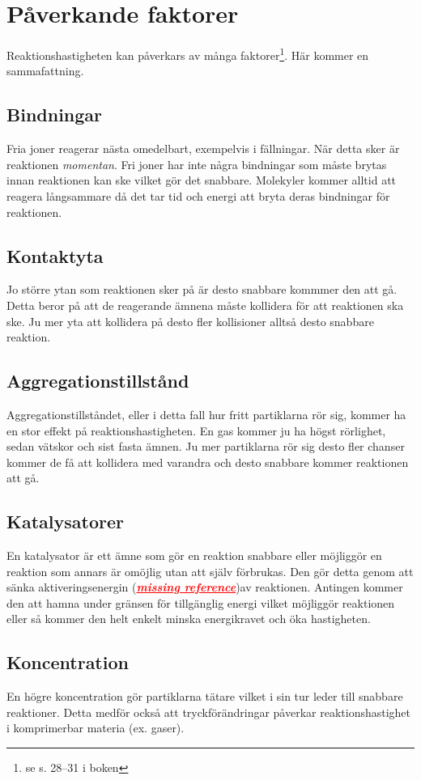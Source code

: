 \section{Påverkande faktorer}
Reaktionshastigheten kan påverkars av många faktorer\footnote{se s. 28--31 i boken}. Här kommer en sammafattning.
\subsection{Bindningar}
Fria joner reagerar nästa omedelbart, exempelvis i fällningar. När detta sker är reaktionen \emph{momentan}. Fri joner har inte några bindningar som måste brytas innan reaktionen kan ske vilket gör det snabbare. Molekyler kommer alltid att reagera långsammare då det tar tid och energi att bryta deras bindningar för reaktionen.

\subsection{Kontaktyta}
Jo större ytan som reaktionen sker på är desto snabbare kommmer den att gå. Detta beror på att de reagerande ämnena måste kollidera för att reaktionen ska ske. Ju mer yta att kollidera på desto fler kollisioner alltså desto snabbare reaktion.

\subsection{Aggregationstillstånd}
Aggregationstillståndet, eller i detta fall hur fritt partiklarna rör sig, kommer ha en stor effekt på reaktionshastigheten. En gas kommer ju ha högst rörlighet, sedan vätskor och sist fasta ämnen. Ju mer partiklarna rör sig desto fler chanser kommer de få att kollidera med varandra och desto snabbare kommer reaktionen att gå.

\subsection{Katalysatorer}
\label{sec:katalysator}
En katalysator är ett ämne som gör en reaktion snabbare eller möjliggör en reaktion som annars är omöjlig utan att själv förbrukas. Den gör detta genom att sänka aktiveringsenergin (\textcolor{red}{\underline{\textbf{\textit{missing reference}}}})av reaktionen. Antingen kommer den att hamna under gränsen för tillgänglig energi vilket möjliggör reaktionen eller så kommer den helt enkelt minska energikravet och öka hastigheten.

\subsection{Koncentration}
En högre koncentration gör partiklarna tätare vilket i sin tur leder till snabbare reaktioner. Detta medför också att tryckförändringar påverkar reaktionshastighet i komprimerbar materia (ex. gaser).

